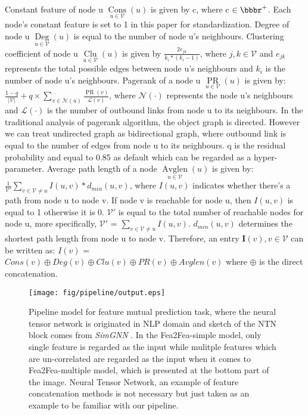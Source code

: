 \documentclass[runningheads]{llncs}
\newcommand{\xhdr}[1]{\vspace{1.7mm}\noindent{{\bf #1}}}
\begin{document}
\xhdr{Feature extraction} Constant feature of node u $\mathop{Cons}\limits_{u \in \mathcal{V}}(u)$ is given by c, 
where c $\in \bbbr^{+}$. Each node's constant feature is set to 1 in this paper for standardization. 
Degree of node u $\mathop{Deg}\limits_{u \in \mathcal{V}}(u)$ is equal to the number of node u's 
neighbours. 
Clustering coefficient of node u $\mathop{Clu}\limits_{u \in \mathcal{V}}(u)$ is given by $\frac{2e_{jk}}
{k_{i} * (k_{i} - 
1)}$, where $j,k \in \mathcal{V}$ and $e_{jk}$ represents the total possible edges between node u's 
neighbours and
$k_{i}$ is the number of node u's neighbours. Pagerank of a node u $\mathop{PR}\limits_{u \in \mathcal{V}}
(u)$ is given by:
 $\frac{1-q}{|\mathcal V|} + q \times \sum_{v \in {\mathcal 
N} 
  (u)}\frac{\mathop{PR}(v)}{\mathcal L(v)}$,
where $\mathcal N(\cdot)$ represents the node u's neighbours and $\mathcal L(\cdot)$ is the number of outbound links 
from node u
to its neighbours. In the traditional analysis of pagerank algorithm, the object graph is directed. 
However we can treat
undirected graph as bidirectional graph, where outbound link is equal to the number of edges from node u to 
its neighbours.
q is the residual probability and equal to 0.85 as default which can be regarded as a hyper-parameter. Average path 
length of a node  $\mathop{Avglen}
\limits_{u \in \mathcal{V}}(u)$ is given by:
$ \frac{1}{\mathcal V '}\sum_{v \in {\mathcal V}\neq u} I(u,v) * d_{min}(u,
v)$,
where $I(u,v)$ indicates whether there's a path from node u to node v. If node v is reachable for node u,
then $I(u,v)$ is equal to 1 otherwise it is 0. $\mathcal V'$ is equal to the total number of reachable nodes 
for node u,
more specifically, $\mathcal V'$ = $\sum_{v \in {\mathcal V}\neq u} I(u,v) $. $d_{min}(u,v)$ determines 
the shortest path
length from node u to node v.
Therefore, an entry $\textbf{I}(v), v \in \mathcal V$ can be written as:  $I
(v)$  = $Cons(v) \oplus  Deg(v) \oplus Clu(v) \oplus PR(v) \oplus Avglen(v)$ where $\oplus$ is the 
direct concatenation.
\vspace{-0.5cm}
\begin{figure}
  \centering
  \texttt{[image: fig/pipeline/output.eps]}
  \caption{Pipeline model for feature mutual prediction task, where 
the neural tensor network is originated in NLP domain \cite
{NIPS2013_b337e84d} and sketch of the NTN block comes from \textit
{SimGNN} \cite{bai2020simgnn}. In the Fea2Fea-simple model, only single feature is regarded as the input while mulitple features which are un-correlated are regarded as the input when it comes to Fea2Fea-multiple model, which is presented at the bottom part of the image. Neural Tensor Network, an example of feature concatenation methods is not necessary but just taken as an example to be familiar with our pipeline. }
\end{figure}
\end{document}
